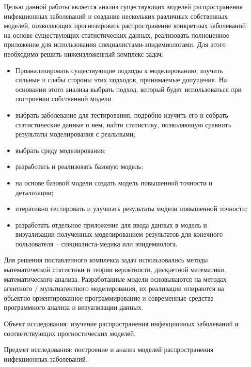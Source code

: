 Целью данной работы является анализ существующих моделей распространения инфекционных заболеваний и  создание нескольких различных собственных моделей, позволяющих прогнозировать распространение конкретных заболеваний на основе существующих статистических данных, реализовать полноценное приложение для использования \newline специалистами-эпидемиологами.  Для этого необходимо решить нижеизложенный комплекс задач:
\begin{itemize}
	\item Проанализировать существующие подходы к моделированию, изучить сильные и слабы стороны этих подходов, принимаемые допущения. На основании этого анализа выбрать подход, который будет использоваться при построении собственной модели.
	
	\item выбрать заболевание для тестирования, подробно изучить его и собрать статистические данные о нем, найти статистику, позволяющую сравнить результаты моделирования с реальными;
	
	\item выбрать среду моделирования;
	
	\item разработать и реализовать базовую модель;
	
	\item на основе базовой модели создать модель повышенной точности и детализации;
	
	\item итеративно тестировать и улучшать результаты модели повышенной точности; 
	
	\item разработать отдельное приложение для ввода данных в модель и визуализации полученных моделированием результатов для конечного пользователя -- специалиста-медика или эпидемиолога. 	
\end{itemize}

Для решения поставленного комплекса задач использовались методы математической статистики и теории вероятности, дискретной математики, математического анализа. Разработанные модели основываются на методах агентного / мультиагентного моделирования, их реализации опираются на объектно-ориентированное программирование и современные средства  программного анализа и визуализации данных. 

Объект исследования: изучение распространения инфекционных заболеваний и соответствующих прогностических моделей.

Предмет исследования: построение и анализ моделей распространения инфекционных заболеваний.

